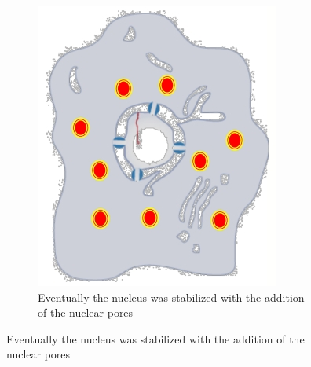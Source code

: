 \documentclass[]{article}
\begin{document}
\begin{figure}[H]
\begin{subfigure}[b]{0.45\textwidth}
	\end{subfigure}
	\begin{subfigure}[b]{0.45\textwidth}
		\caption{Eventually the nucleus was stabilized with the addition of the nuclear pores}\label{fig:outside:in4}
		\includegraphics[width=\textwidth]{OutsideIn4}
	\end{subfigure}
\end{figure}
\end{document}
